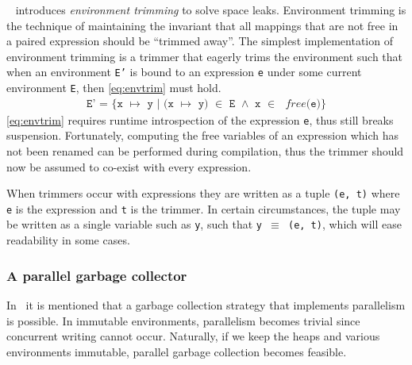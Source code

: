 ~\cite{sestoft1997deriving} introduces \textit{environment trimming} to solve space leaks.
Environment trimming is the technique of maintaining the invariant that all mappings that are not free in a paired expression should be ``trimmed away''.
The simplest implementation of environment trimming is a trimmer that eagerly trims the environment such that when an environment \texttt{E'} is bound to an expression \texttt{e} under some current environment \texttt{E}, then \autoref{eq:envtrim} must hold.
\begin{align}
	\texttt{E' = \{x $\mapsto$ y | (x $\mapsto$ y) $\in$ E $\land$ x $\in$ }\textit{free}\texttt{(e)\}}\label{eq:envtrim}
\end{align}
\autoref{eq:envtrim} requires runtime introspection of the expression \texttt{e}, thus still breaks suspension.
Fortunately, computing the free variables of an expression which has not been renamed can be performed during compilation, thus the trimmer should now be assumed to co-exist with every expression.
\begin{remark}
	When trimmers occur with expressions they are written as a tuple \texttt{(e, t)} where \texttt{e} is the expression and \texttt{t} is the trimmer.
	In certain circumstances, the tuple may be written as a single variable such as \texttt{y}, such that \texttt{y $\equiv$ (e, t)}, which will ease readability in some cases.
\end{remark}

\subsubsection{A parallel garbage collector}\label{sec:pargc}
In~\cite{launchbury1993natural} it is mentioned that a garbage collection strategy that implements parallelism is possible.
In immutable environments, parallelism becomes trivial since concurrent writing cannot occur.
Naturally, if we keep the heaps and various environments immutable, parallel garbage collection becomes feasible.

